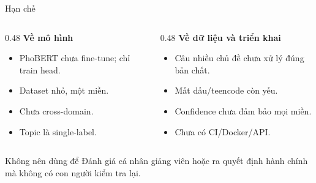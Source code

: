 \documentclass[aspectratio=169,11pt]{beamer}
\begin{document}
\begin{frame}{Hạn chế}
\begin{columns}[T]
\begin{column}{0.48\textwidth}
\textbf{Về mô hình}
\begin{itemize}
  \item PhoBERT chưa fine-tune; chỉ train head.
  \item Dataset nhỏ, một miền.
  \item Chưa cross-domain.
  \item Topic là single-label.
\end{itemize}
\end{column}
\begin{column}{0.48\textwidth}
\textbf{Về dữ liệu và triển khai}
\begin{itemize}
  \item Câu nhiều chủ đề chưa xử lý đúng bản chất.
  \item Mất dấu/teencode còn yếu.
  \item Confidence chưa đảm bảo mọi miền.
  \item Chưa có CI/Docker/API.
\end{itemize}
\end{column}
\end{columns}

\vspace{0.3cm}
\begin{alertblock}{Không nên dùng để}
Đánh giá cá nhân giảng viên hoặc ra quyết định hành chính mà không có con người kiểm tra lại.
\end{alertblock}
\end{frame}
\end{document}
